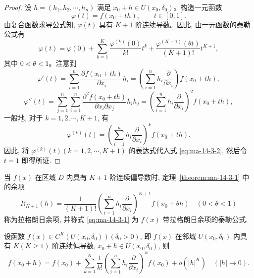 \begin{proof}
设 $h=(h_1,h_2,\cdots,h_n)$ 满足 $x_0+h\in U(x_0,\delta_0)$。构造一元函数
\[
  \varphi(t)=f(x_0+th),\qquad t\in[0,1].
\]
由复合函数求导公式知, $\varphi(t)$ 具有 $K+1$ 阶连续导数。因此, 由一元函数的泰勒公式有
\begin{equation}
  \varphi(t)=\varphi(0)+\sum_{k=1}^K
  \frac{\varphi^{(k)}(0)}{k!}t^k
  +\frac{\varphi^{(K+1)}(\theta t)}{(K+1)!}t^{K+1},
  \label{eq:ma-14-3-2}
\end{equation}
其中 $0<\theta<1$。注意到
\[
  \varphi'(t)=\sum_{i=1}^n\frac{\partial f(x_0+th)}{\partial x_i}h_i
  =\left(\sum_{i=1}^n h_i\frac{\partial}{\partial x_i}\right)f(x_0+th),
\]
\[
  \varphi''(t)=\sum_{j=1}^n\sum_{i=1}^n
  \frac{\partial^2 f(x_0+th)}{\partial x_i\partial x_j}h_ih_j
  =\left(\sum_{i=1}^n h_i\frac{\partial}{\partial x_i}\right)^2 f(x_0+th),
\]
一般地, 对于 $k=1,2,\cdots,K+1$, 有
\[
  \varphi^{(k)}(t)
  =\left(\sum_{i=1}^n h_i\frac{\partial}{\partial x_i}\right)^k f(x_0+th).
\]
因此, 将 $\varphi^{(k)}(t)(k=1,2,\cdots,K+1)$ 的表达式代入式 \eqref{eq:ma-14-3-2}, 然后令 $t=1$ 即得所证.
\end{proof}


\begin{remark}\label{remark:ma-14-source-71}
当 $f(x)$ 在区域 $D$ 内具有 $K+1$ 阶连续偏导数时, 定理~\ref{theorem:ma-14-3-1} 中的余项
\[
  R_{K+1}(h)=\frac1{(K+1)!}
  \left(\sum_{i=1}^n h_i\frac{\partial}{\partial x_i}\right)^{K+1}f(x_0+\theta h)
  \quad(0<\theta<1)
\]
称为拉格朗日余项, 并称式 \eqref{eq:ma-14-3-1} 为 $f(x)$ 带拉格朗日余项的泰勒公式.
\end{remark}


\begin{corollary}\label{corollary:ma-local-14.3-1}
设函数 $f(x)\in C^K(U(x_0,\delta_0))(\delta_0>0)$, 即 $f(x)$ 在邻域 $U(x_0,\delta_0)$ 内具有 $K(K\geqslant1)$ 阶连续偏导数, $x_0+h\in U(x_0,\delta_0)$, 则
\begin{equation}
  f(x_0+h)=f(x_0)+\sum_{k=1}^K\frac1{k!}
  \left(\sum_{i=1}^n h_i\frac{\partial}{\partial x_i}\right)^k f(x_0)
  +o(|h|^K)
  \quad(|h|\to0).
  \label{eq:ma-14-3-3}
\end{equation}
\end{corollary}


